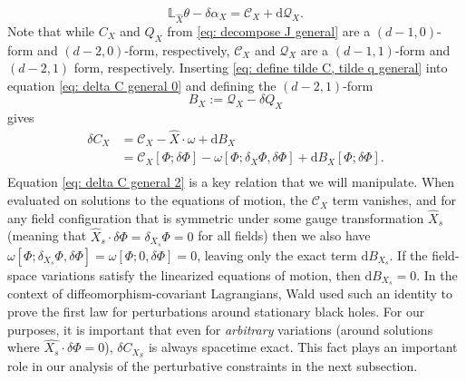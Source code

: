 \documentclass[]{jkpaper}
\theoremstyle{plain}
\theoremstyle{definition}
\newcommand{\fins}{\cdot}
\newcommand{\sd}{\mathrm {d}}
\def\extd{\mathrm {d}}
\newcommand{\fd}{\delta}
\newcommand{\fL}{\mathbb{L}}
\begin{document}
\begin{equation}\label{eq: define tilde C, tilde q general}
    \fL_{\hat{X}}\theta-\delta \alpha_{X} = \mathcal{C}_X + \extd \mathcal{Q}_X.
\end{equation}
Note that while $C_{X}$ and $Q_{X}$ from \eqref{eq: decompose J general} are a $(d-1,0)$-form and $(d-2,0)$-form, respectively, $\mathcal{C}_{X}$ and $\mathcal{Q}_{X}$ are a $(d-1,1)$-form and $(d-2,1)$ form, respectively. Inserting \eqref{eq: define tilde C, tilde q general} into equation \eqref{eq: delta C general 0} and defining the $(d-2,1)$-form
\begin{equation}\label{eq: boundary term general}
    B_{X}:=\mathcal{Q}_{X}-\fd Q_{X}
\end{equation}
gives
\begin{equation}\begin{split}\label{eq: delta C general 2}
    \fd C_{X} 
    &=\mathcal{C}_{X}-\hat{X}\cdot \omega +\sd B_{X}\\
    &=\mathcal{C}_{X}[\Phi;\fd\Phi]- \omega[\Phi;\delta_X\Phi,\fd\Phi] +\extd B_{X}[\Phi;\fd\Phi].\\
\end{split}\end{equation}
Equation \eqref{eq: delta C general 2} is a key relation that we will manipulate.  When evaluated on solutions to the equations of motion, the $\mathcal{C}_X$ term vanishes, and for any field configuration that is symmetric under some gauge transformation $\hat{X}_s$ (meaning that $\hat{X}_s\fins\fd\Phi=\delta_{X_s}\Phi=0$ for all fields) then we also have $\omega[\Phi;\delta_{X_s}\Phi,\fd\Phi]=\omega[\Phi;0,\fd\Phi]=0$, leaving only the exact term $\sd B_{X_s}$.  If the field-space variations satisfy the linearized equations of motion, then $\extd B_{X_s}=0$.  In the context of diffeomorphism-covariant Lagrangians, Wald \cite{Wald:1993nt} used such an identity to prove the first law for perturbations around stationary black holes.  For our purposes, it is important that even for \textit{arbitrary} variations (around solutions where $\hat{X_s}\fins \fd\Phi=0$), $\fd C_{X_S}$ is always spacetime exact.  This fact plays an important role in our analysis of the perturbative constraints in the next subsection.
\end{document}
